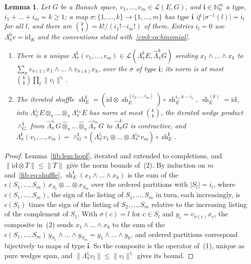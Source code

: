 \documentclass[11pt]{amsart}
\newtheorem{lemma}[theorem]{Lemma}
\theoremstyle{definition}
\theoremstyle{remark}
\numberwithin{equation}{section}
\newcommand{\N}{\mathbb N}
\newcommand{\cL}{\mathcal L}
\newcommand{\id}{\mathrm{id}}
\newcommand{\abs}[1]{\lvert #1\rvert}
\newcommand{\norm}[1]{\lVert #1\rVert}
\theoremstyle{plain}
\theoremstyle{definition}
\theoremstyle{plain}
\newcommand{\sh}{\operatorname{sh}}
\newcommand{\hot}{\mathbin{\widehat\otimes}}
\newcommand{\hLambda}{\widehat\Lambda}
\begin{document}
\begin{lemma}\label{fmo:lem:multishuffle}
Let $G$ be a Banach space, $v_1,\dots,v_m\in\cL(E,G)$, and $\mathbf i\in\N_0^m$ a \emph{type}, $i_1+\dots+i_m=k\ge1$; a map
$\sigma\colon\{1,\dots,k\}\to\{1,\dots,m\}$ has type $\mathbf i$ if $\abs{\sigma^{-1}(l)}=i_l$ for all $l$, and there are
$\binom k{\mathbf i}=k!/(i_1!\cdots i_m!)$ of them. Entries $i_l=0$ use $\Lambda^0_\pi v=\id_K$ and the conventions stated
with~\eqref{cmb:eq:binomial}.
\begin{enumerate}
\item There is a unique $\Lambda^{\mathbf i}_\pi(v_1,\dots,v_m)\in\cL(\Lambda^k_\pi E,\hLambda^k_\pi G)$ sending
$x_1\wedge\dots\wedge x_k$ to $\sum_\sigma v_{\sigma(1)}x_1\wedge\dots\wedge v_{\sigma(k)}x_k$, over the $\sigma$ of type
$\mathbf i$; its norm is at most $\binom k{\mathbf i}\prod_l\norm{v_l}^{i_l}$.
\item The iterated shuffle $\sh^{\mathbf i}_E=(\id\otimes\sh^{(i_2,\dots,i_m)}_E)\circ\sh^{i_1,k-i_1}_E$, $\sh^{(k)}_E=\id$, into
$\Lambda^{i_1}_\pi E\otimes_\pi\dots\otimes_\pi\Lambda^{i_m}_\pi E$ has norm at most $\binom k{\mathbf i}$, the iterated wedge
product $\wedge^{\mathbf i}_G$ from $\hLambda^{i_1}_\pi G\hot_\pi\dots\hot_\pi\hLambda^{i_m}_\pi G$ to $\hLambda^k_\pi G$ is
contractive, and $\Lambda^{\mathbf i}_\pi(v_1,\dots,v_m)=\wedge^{\mathbf i}_G\circ(\Lambda^{i_1}_\pi v_1\otimes\dots\otimes
\Lambda^{i_m}_\pi v_m)\circ\sh^{\mathbf i}_E$.
\end{enumerate}
\end{lemma}

\begin{proof}
Lemma~\ref{fib:lem:hopf}, iterated and extended to completions, and $\norm{\id\otimes T}\le\norm T$ give the norm bounds
of~(2). By induction on $m$ and~\eqref{fib:eq:shuffle}, $\sh^{\mathbf i}_E(x_1\wedge\dots\wedge x_k)$ is the sum of the
$\epsilon(S_1,\dots,S_m)\,x_{S_1}\otimes\dots\otimes x_{S_m}$ over the ordered partitions with $\abs{S_l}=i_l$, where
$\epsilon(S_1,\dots,S_m)$, the sign of the listing of $S_1,\dots,S_m$ in turn, each increasingly, is $\epsilon(S_1)$ times
the sign of the listing of $S_2,\dots,S_m$ relative to the increasing listing of the complement of $S_1$. With
$\sigma(c)=l$ for $c\in S_l$ and $y_c=v_{\sigma(c)}x_c$, the composite in~(2) sends $x_1\wedge\dots\wedge x_k$ to the sum of
the $\epsilon(S_1,\dots,S_m)\,y_{S_1}\wedge\dots\wedge y_{S_m}=y_1\wedge\dots\wedge y_k$, and ordered partitions correspond
bijectively to maps of type $\mathbf i$. So the composite is the operator of~(1), unique as pure wedges span, and
$\norm{\Lambda^{i_l}_\pi v_l}\le\norm{v_l}^{i_l}$ gives its bound.
\end{proof}
\end{document}
